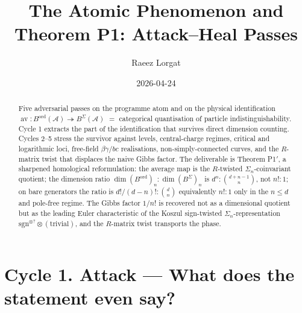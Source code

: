 \documentclass[11pt]{article}
\title{The Atomic Phenomenon and Theorem P1: Attack--Heal Passes}
\author{Raeez Lorgat}
\date{2026-04-24}
\theoremstyle{definition}
\DeclareMathOperator{\av}{av}
\newcommand{\ord}{\mathrm{ord}}
\begin{document}
\maketitle

\begin{abstract}
Five adversarial passes on the programme atom and on the physical identification
\(\av: B^{\ord}(\mathcal{A}) \twoheadrightarrow B^{\Sigma}(\mathcal{A})\)
$=$ categorical quantisation of particle indistinguishability. Cycle 1
extracts the part of the identification that survives direct dimension
counting. Cycles 2--5 stress the survivor against levels, central-charge
regimes, critical and logarithmic loci, free-field $\beta\gamma$/$bc$
realisations, non-simply-connected curves, and the $R$-matrix twist that
displaces the naive Gibbs factor. The deliverable is Theorem P1$'$, a
sharpened homological reformulation: the average map is the $R$-twisted
$\Sigma_n$-coinvariant quotient; the dimension ratio
$\dim(B^{\ord})_n : \dim(B^{\Sigma})_n$ is $d^n : \binom{d+n-1}{n}$, not
$n! : 1$; on bare generators the ratio is $d!/(d-n)! : \binom{d}{n}$
equivalently $n! : 1$ only in the $n \le d$ and pole-free regime. The
Gibbs factor $1/n!$ is recovered not as a dimensional quotient but as
the leading Euler characteristic of the Koszul sign-twisted
$\Sigma_n$-representation $\mathrm{sgn}^{\otimes ?} \otimes (\text{trivial})$,
and the $R$-matrix twist transports the phase.
\end{abstract}

\section*{Cycle 1. Attack --- What does the statement even say?}
\end{document}
